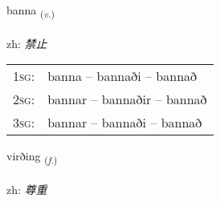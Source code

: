 \documentclass[frontgrid, backgrid]{flacards}\usepackage[]{graphicx}\usepackage[]{color}
\begin{document}
\renewcommand{\blhead}{\vskip5pt {\small\bfseries\footnotesize Sagnorð | 动词 }}
\renewcommand{\bcfoot}{\vskip5pt \hspace{2pt}{\small\bfseries\footnotesize 2K}}


{banna \small{\textsubscript{(\textit{v.})}} \\[1ex] %
\textphonetic{[pana]} \\
zh: \emph{禁止} \\  [2ex]
\renewcommand*{\arraystretch}{0.8}
\begin{tabular}{p{1cm}l}
\textsc{1sg}: & banna -- bannaði -- bannað \\ 
\textsc{2sg}: & bannar -- bannaðir -- bannað \\ 
\textsc{3sg}: & bannar -- bannaði -- bannað \\ 
\end{tabular}
}

\renewcommand{\flhead}{\vskip5pt \fboxsep=0pt {\small\bfseries\footnotesize Nafnorð | 名词}}
\renewcommand{\fcfoot}{\vskip5pt \fboxsep=0pt \hspace{2pt}{\small\bfseries\footnotesize 2K}}

\renewcommand{\blhead}{\vskip5pt {\small\bfseries\footnotesize Nafnorð | 名词 }}
\renewcommand{\bcfoot}{\vskip5pt \hspace{2pt}{\small\bfseries\footnotesize 2K}}


{virðing \small{\textsubscript{(\textit{f.})}} \\[1ex] %
\textphonetic{[vɪrðiŋk]} \\
zh: \emph{尊重} \\  [2ex]
\renewcommand*{\arraystretch}{0.8}
}

\renewcommand{\flhead}{\vskip5pt \fboxsep=0pt {\small\bfseries\footnotesize Nafnorð | 名词}}
\renewcommand{\fcfoot}{\vskip5pt \fboxsep=0pt \hspace{2pt}{\small\bfseries\footnotesize 2K}}
\end{document}
